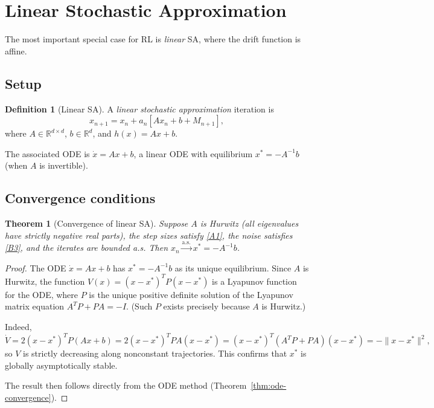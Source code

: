 \documentclass[11pt,a4paper]{article}
\theoremstyle{definition}
\newtheorem{definition}{Definition}[section]
\theoremstyle{plain}
\newtheorem{theorem}{Theorem}[section]
\theoremstyle{remark}
\newcommand{\R}{\mathbb{R}}
\newcommand{\cas}{\xrightarrow{\text{a.s.}}}
\begin{document}
\section{Linear Stochastic Approximation}
\label{sec:linear-sa}

The most important special case for RL is \emph{linear} SA, where the drift function
is affine.

\subsection{Setup}

\begin{definition}[Linear SA]
\label{def:linear-sa}
A \emph{linear stochastic approximation} iteration is
\begin{equation}
\label{eq:linear-sa}
  x_{n+1} = x_n + a_n [A x_n + b + M_{n+1}],
\end{equation}
where $A \in \R^{d \times d}$, $b \in \R^d$, and $h(x) = Ax + b$.
\end{definition}

The associated ODE is $\dot{x} = Ax + b$, a linear ODE with equilibrium
$x^* = -A^{-1}b$ (when $A$ is invertible).

\subsection{Convergence conditions}

\begin{theorem}[Convergence of linear SA]
\label{thm:linear-sa}
Suppose $A$ is Hurwitz (all eigenvalues have strictly negative real parts), the step
sizes satisfy \ref{A1}, the noise satisfies \ref{B3}, and the iterates are bounded
a.s. Then $x_n \cas x^* = -A^{-1}b$.
\end{theorem}

\begin{proof}
The ODE $\dot{x} = Ax + b$ has $x^* = -A^{-1}b$ as its unique equilibrium. Since
$A$ is Hurwitz, the function $V(x) = (x - x^*)^T P (x - x^*)$ is a Lyapunov function
for the ODE, where $P$ is the unique positive definite solution of the Lyapunov matrix
equation $A^T P + P A = -I$. (Such $P$ exists precisely because $A$ is Hurwitz.)

Indeed,
\[
  \dot{V} = 2(x - x^*)^T P (Ax + b)
    = 2(x - x^*)^T P A (x - x^*)
    = (x - x^*)^T (A^T P + PA)(x - x^*) = -\|x - x^*\|^2,
\]
so $V$ is strictly decreasing along nonconstant trajectories. This confirms that
$x^*$ is globally asymptotically stable.

The result then follows directly from the ODE method
(Theorem~\ref{thm:ode-convergence}).
\end{proof}
\end{document}
